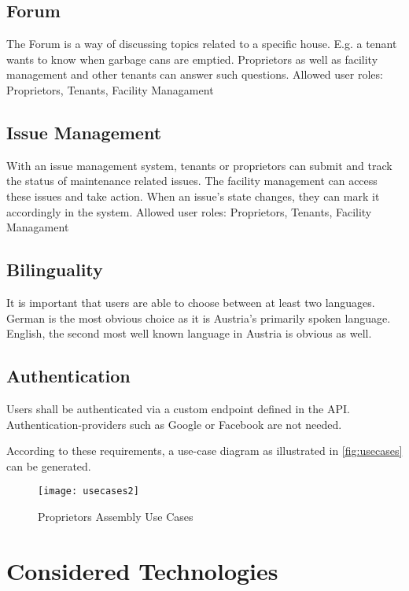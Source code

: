 \subsection{Forum}
The Forum is a way of discussing topics related to a specific house. E.g. a tenant wants to know when garbage cans are emptied. Proprietors as well as facility management and other tenants can answer such questions. \newline
Allowed user roles: Proprietors, Tenants, Facility Managament

\subsection{Issue Management}
With an issue management system, tenants or proprietors can submit and track the status of maintenance related issues. The facility management can access these issues and take action. When an issue's state changes, they can mark it accordingly in the system. \newline
Allowed user roles: Proprietors, Tenants, Facility Managament

\subsection{Bilinguality}
It is important that users are able to choose between at least two languages. German is the most obvious choice as it is Austria's primarily spoken language. English, the second most well known language in Austria is obvious as well.

\subsection{Authentication}
Users shall be authenticated via a custom endpoint defined in the API. Authentication-providers such as Google or Facebook are not needed. \newline

According to these requirements, a use-case diagram as illustrated in \autoref{fig:usecases} can be generated.
\begin{figure}[H]
    \begin{center}
    \texttt{[image: usecases2]}
    \end{center}
    \caption{Proprietors Assembly Use Cases}
    \label{fig:usecases}
\end{figure}

\section{Considered Technologies}
